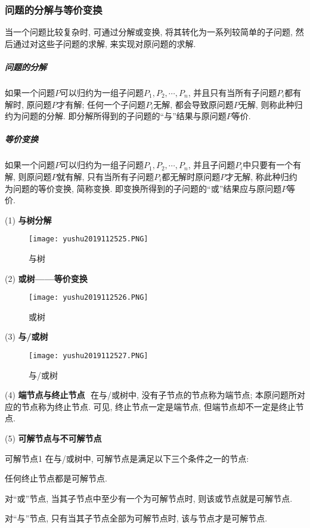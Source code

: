 \subsubsection{问题的分解与等价变换}
当一个问题比较复杂时, 可通过分解或变换, 将其转化为一系列较简单的子问题, 然后通过对这些子问题的求解, 来实现对原问题的求解.
\subparagraph{问题的分解}
如果一个问题$P$可以归约为一组子问题$P_1,P_2,\cdots,P_n$, 并且只有当所有子问题$P_i$都有解时, 原问题$P$才有解; 任何一个子问题$P_i$无解, 都会导致原问题$P$无解, 则称此种归约为问题的分解.
即分解所得到的子问题的“与”结果与原问题$P$等价.
\subparagraph{等价变换}
如果一个问题$P$可以归约为一组子问题$P_1,P_2,\cdots,P_n$, 并且子问题$P_i$中只要有一个有解, 则原问题$P$就有解, 只有当所有子问题$P_i$都无解时原问题$P$才无解, 称此种归约为问题的等价变换, 简称变换.
即变换所得到的子问题的“或”结果应与原问题$P$等价.

(1) \textbf{与树分解}
\begin{figure}[H]
    \centering
    \texttt{[image: yushu2019112525.PNG]}
    \caption{与树 }
    \label{AI32fig25}
\end{figure}

(2) \textbf{或树——等价变换}
\begin{figure}[H]
    \centering
    \texttt{[image: yushu2019112526.PNG]}
    \caption{或树 }
    \label{AI32fig26}
\end{figure}

(3) \textbf{与/或树}
\begin{figure}[H]
    \centering
    \texttt{[image: yushu2019112527.PNG]}
    \caption{与/或树 }
    \label{AI32fig27}
\end{figure}
(4) \textbf{端节点与终止节点}\,\, 在与/或树中, 没有子节点的节点称为端节点; 本原问题所对应的节点称为终止节点. 可见, 终止节点一定是端节点, 但端节点却不一定是终止节点.

(5) \textbf{可解节点与不可解节点}
\begin{mydef}{可解节点}{1}
在与/或树中, 可解节点是满足以下三个条件之一的节点:

 任何终止节点都是可解节点.

 对“或”节点, 当其子节点中至少有一个为可解节点时, 则该或节点就是可解节点.

 对“与”节点, 只有当其子节点全部为可解节点时, 该与节点才是可解节点.
\end{mydef}

